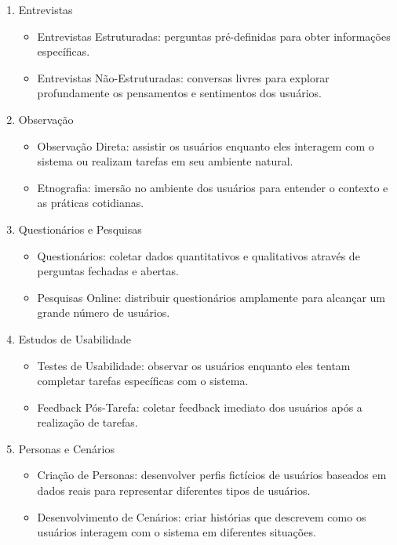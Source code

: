 \documentclass[
  12pt,
  openright,
  twoside,
  a4paper,
  english,
  french,
  spanish,
  brazil
]{abntex2}
\begin{document}
\begin{enumerate}
  \item Entrevistas
  \begin{itemize}
    \item
      Entrevistas Estruturadas: perguntas pré-definidas para obter informações
      específicas.
    \item
      Entrevistas Não-Estruturadas: conversas livres para explorar profundamente
      os pensamentos e sentimentos dos usuários.
  \end{itemize}
  \item Observação
  \begin{itemize}
    \item
      Observação Direta: assistir os usuários enquanto eles interagem com o
      sistema ou realizam tarefas em seu ambiente natural.
    \item
      Etnografia: imersão no ambiente dos usuários para entender o contexto e as
      práticas cotidianas.
  \end{itemize}
  \item Questionários e Pesquisas
  \begin{itemize}
    \item
      Questionários: coletar dados quantitativos e qualitativos através de
      perguntas fechadas e abertas.
    \item
      Pesquisas Online: distribuir questionários amplamente para alcançar um
      grande número de usuários.
  \end{itemize}
  \item Estudos de Usabilidade
  \begin{itemize}
    \item
      Testes de Usabilidade: observar os usuários enquanto eles tentam completar
      tarefas específicas com o sistema.
    \item
      Feedback Pós-Tarefa: coletar feedback imediato dos usuários após a
      realização de tarefas.
  \end{itemize}
  \item Personas e Cenários
  \begin{itemize}
    \item
      Criação de Personas: desenvolver perfis fictícios de usuários baseados em
      dados reais para representar diferentes tipos de usuários.
    \item
      Desenvolvimento de Cenários: criar histórias que descrevem como os
      usuários interagem com o sistema em diferentes situações.
  \end{itemize}
\end{enumerate}
\end{document}
